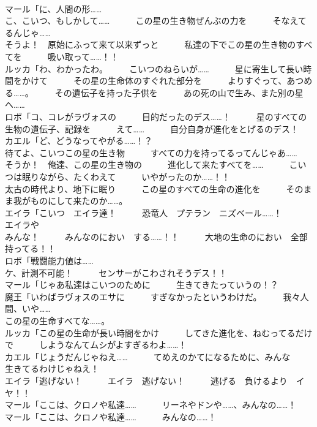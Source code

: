 \documentclass[8pt]{extreport}
\begin{document}
\begin{CJK}{UTF8}{min}
\\	マール「に、人間の形……	
\\	こ、こいつ、もしかして……　　　この星の生き物ぜんぶの力を　　　そなえてるんじゃ……	
\\	そうよ！　原始にふって来て以来ずっと　　　私達の下でこの星の生き物のすべてを　　　吸い取って……！！	
\\	ルッカ「わ、わかったわ。　　　こいつのねらいが……　　　星に寄生して長い時間をかけて　　　その星の生命体のすぐれた部分を　　　よりすぐって、あつめる……。　　　その遺伝子を持った子供を　　　あの死の山で生み、また別の星へ……	
\\	ロボ「コ、コレがラヴォスの　　　目的だったのデス……！　　　星のすべての生物の遺伝子、記録を　　　えて……　　　自分自身が進化をとげるのデス！	
\\	カエル「ど、どうなってやがる……！？	
\\	待てよ、こいつこの星の生き物　　　すべての力を持ってるってんじゃあ……	
\\	そうか！　俺達、この星の生き物の　　　進化して来たすべてを……　　　こいつは眠りながら、たくわえて　　　いやがったのか……！！	
\\	太古の時代より、地下に眠り　　　この星のすべての生命の進化を　　　そのまま我がものにして来たのか……。	
\\	エイラ「こいつ　エイラ達！　　　恐竜人　プテラン　ニズベール……！　　　エイラや　
\\	みんな！　　　みんなのにおい　する……！！　　　大地の生命のにおい　全部　　　持ってる！！	
\\	ロボ「戦闘能力値は……	
\\	ケ、計測不可能！　　　センサーがこわされそうデス！！	
\\	マール「じゃあ私達はこいつのために　　　生きてきたっていうの！？	
\\	魔王「いわばラヴォスのエサに　　　すぎなかったというわけだ。　　　我々人間、いや……	
\\	この星の生命すべてな……。	
\\	ルッカ「この星の生命が長い時間をかけ　　　してきた進化を、ねむってるだけで　　　しようなんてムシがよすぎるわよ……！	
\\	カエル「じょうだんじゃねえ……　　　てめえのかてになるために、みんな　　　生きてるわけじゃねえ！	
\\	エイラ「逃げない！　　　エイラ　逃げない！　　　逃げる　負けるより　イヤ！！	
\\	マール「ここは、クロノや私達……　　　リーネやドンや……、みんなの……！	
\\	マール「ここは、クロノや私達……　　　みんなの……！	

\end{CJK}
\end{document}
